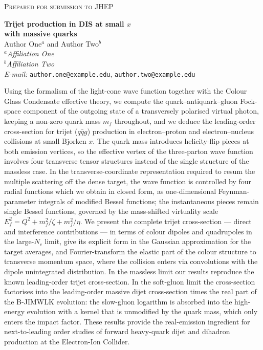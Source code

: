 \documentclass[11pt,a4paper]{article}
\numberwithin{equation}{section}
\begin{document}
\begin{flushleft}
\textsc{Prepared for submission to JHEP}
\end{flushleft}
\vspace{1.2cm}

\begin{center}
{\LARGE\bf Trijet production in DIS at small $x$\\[4pt] with massive quarks}\\[1.4cm]
{\large Author One$^{a}$ and Author Two$^{b}$}\\[5mm]
{\itshape $^{a}$Affiliation One\\
$^{b}$Affiliation Two}\\[3mm]
{\itshape E-mail:} \texttt{author.one@example.edu}, \texttt{author.two@example.edu}
\end{center}
\vspace{0.9cm}

 Using the formalism of the light-cone wave function together with
the Colour Glass Condensate effective theory, we compute the quark--antiquark--gluon Fock-space
component of the outgoing state of a transversely polarised virtual photon, keeping a non-zero
quark mass $m_f$ throughout, and we deduce the leading-order cross-section for trijet
($q\bar qg$) production in electron--proton and electron--nucleus collisions at small Bjorken
$x$. The quark mass introduces helicity-flip pieces at both emission vertices, so the effective
vertex of the three-parton wave function involves four transverse tensor structures instead of
the single structure of the massless case. In the transverse-coordinate representation required
to resum the multiple scattering off the dense target, the wave function is controlled by four
radial functions which we obtain in closed form, as one-dimensional Feynman-parameter integrals
of modified Bessel functions; the instantaneous pieces remain single Bessel functions, governed
by the mass-shifted virtuality scale $E_f^2=Q^2+m_f^2/\zeta+m_f^2/\eta$. We present the complete
trijet cross-section --- direct and interference contributions --- in terms of colour dipoles
and quadrupoles in the large-$N_c$ limit, give its explicit form in the Gaussian approximation
for the target averages, and Fourier-transform the elastic part of the colour structure to
transverse momentum space, where the collision enters via convolutions with the dipole
unintegrated distribution. In the massless limit our results reproduce the known leading-order
trijet cross-section. In the soft-gluon limit the cross-section factorises into the
leading-order massive dijet cross-section times the real part of the B-JIMWLK evolution:
the slow-gluon logarithm is absorbed into the high-energy evolution with a kernel that is
unmodified by the quark mass, which only enters the impact factor. These results provide the real-emission ingredient for next-to-leading
order studies of forward heavy-quark dijet and dihadron production at the Electron-Ion Collider.
\vspace{0.6cm}
\end{document}
